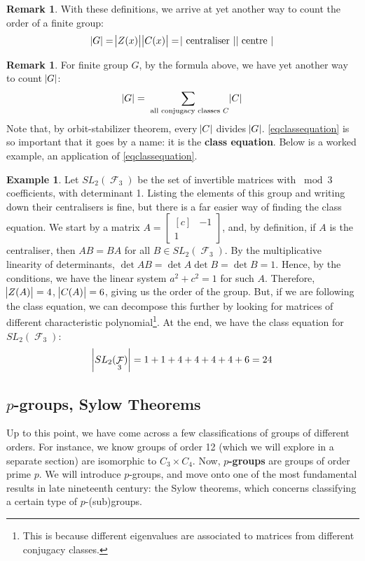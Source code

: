 \documentclass[11pt]{amsart} %
\theoremstyle{definition}
\newtheorem{example}[definition]{Example}
\theoremstyle{definition}
\newtheorem{remark}[definition]{Remark}
\DeclareMathOperator{\FF}{\mathcal{F}}
\numberwithin{equation}{section}
\begin{document}
\begin{remark}
	With these definitions, we arrive at yet another way to count the order of a finite group:
	\begin{align*}
		\abs{G} = \abs{Z(x)} \abs{C(x)} = \abs{\text{ centraliser }} \abs{\text{ centre }}
	\end{align*}
\end{remark}

\begin{remark}
	For finite group $G$, by the formula above, we have yet another way to count $\abs{G}$:
	\begin{align}
	\label{eqclassequation}
		\abs{G} = \sum_{\text{ all conjugacy classes } C} \abs{C}
	\end{align}
	Note that, by orbit-stabilizer theorem, every $\abs{C}$ divides $\abs{G}$. \eqref{eqclassequation} is so important that it goes by a name: it is the \textbf{class equation}. Below is a worked example, an application of \eqref{eqclassequation}.
\end{remark}

\begin{example}
	Let $SL_2 (\FF_3)$ be the set of invertible matrices with $\bmod 3 $ coefficients, with determinant 1. Listing the elements of this group and writing down their centralisers is fine, but there is a far easier way of finding the class equation. We start by a matrix $A = \begin{bmatrix*}[c] & -1 \\ 1 & \end{bmatrix*}$, and, by definition, if $A$ is the centraliser, then $AB = BA$ for all $B \in SL_2 (\FF_3)$. By the multiplicative linearity of determinants, $\det AB = \det A\det B = \det B = 1$. Hence, by the conditions, we have the linear system $a^2 + c^2= 1$ for such $A$. Therefore, $\abs{Z(A)} = 4$, $\abs{C(A)} = 6$, giving us the order of the group. But, if we are following the class equation, we can decompose this further by looking for matrices of different characteristic polynomial\footnote{This is because different eigenvalues are associated to matrices from different conjugacy classes.}. At the end, we have the class equation for $SL_2 (\FF_3)$:
	\begin{align*}
	\abs{SL_2 (\FF_3) } = 1 + 1 + 4 + 4 + 4 + 4 + 6 = 24
	\end{align*}
\end{example}


\subsection{$p$-groups, Sylow Theorems}
Up to this point, we have come across a few classifications of groups of different orders. For instance, we know groups of order 12 (which we will explore in a separate section) are isomorphic to $C_3 \times C_4$. Now, \textbf{$p$-groups} are groups of order prime $p$. We will introduce $p$-groups, and move onto one of the most fundamental results in late nineteenth century: the Sylow theorems, which concerns classifying a certain type of $p$-(sub)groups.
\end{document}
